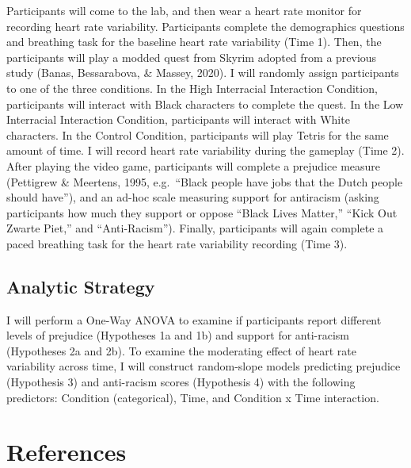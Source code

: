 \documentclass[
  english,
  man, noextraspace,floatsintext]{apa6}
\begin{document}
Participants will come to the lab, and then wear a heart rate monitor for recording heart rate variability. Participants complete the demographics questions and breathing task for the baseline heart rate variability (Time 1). Then, the participants will play a modded quest from Skyrim adopted from a previous study (Banas, Bessarabova, \& Massey, 2020). I will randomly assign participants to one of the three conditions. In the High Interracial Interaction Condition, participants will interact with Black characters to complete the quest. In the Low Interracial Interaction Condition, participants will interact with White characters. In the Control Condition, participants will play Tetris for the same amount of time. I will record heart rate variability during the gameplay (Time 2). After playing the video game, participants will complete a prejudice measure (Pettigrew \& Meertens, 1995, e.g.~{``Black people have jobs that the Dutch people should have''}), and an ad-hoc scale measuring support for antiracism (asking participants how much they support or oppose ``Black Lives Matter,'' ``Kick Out Zwarte Piet,'' and ``Anti-Racism''). Finally, participants will again complete a paced breathing task for the heart rate variability recording (Time 3).

\hypertarget{analytic-strategy}{%
\subsection{Analytic Strategy}\label{analytic-strategy}}

I will perform a One-Way ANOVA to examine if participants report different levels of prejudice (Hypotheses 1a and 1b) and support for anti-racism (Hypotheses 2a and 2b). To examine the moderating effect of heart rate variability across time, I will construct random-slope models predicting prejudice (Hypothesis 3) and anti-racism scores (Hypothesis 4) with the following predictors: Condition (categorical), Time, and Condition x Time interaction.

\newpage

\hypertarget{references}{%
\section{References}\label{references}}

\setlength{\parindent}{-0.5in}
\setlength{\leftskip}{0.5in}
\end{document}
